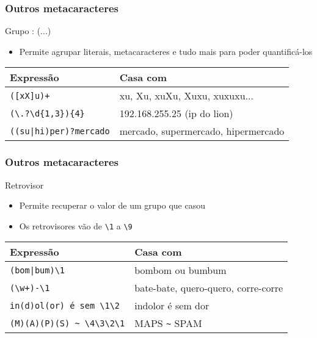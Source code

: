 \documentclass{beamer}
\begin{document}
\begin{frame}[fragile]
 \frametitle{Outros metacaracteres}
 \begin{block}{Grupo : (...)}
  \begin{itemize}
   \item Permite agrupar literais, metacaracteres e tudo mais para poder quantificá-los
  \end{itemize}

  \pause
  \begin{center}
   \begin{tabular}{|l|l|}
	\hline
	\textbf{Expressão} & \textbf{Casa com} \\
	\hline
	\verb=([xX]u)+=   & xu, Xu, xuXu, Xuxu, xuxuxu... \\
	\hline
	\verb=(\.?\d{1,3}){4}= & 192.168.255.25 {\tiny(ip do lion)} \\
	\hline
	\verb=((su|hi)per)?mercado= & {\small mercado, supermercado, hipermercado}\\
	\hline
   \end{tabular}
  \end{center}
 \end{block}
\end{frame}

\begin{frame}[fragile]
 \frametitle{Outros metacaracteres}
 \begin{block}{Retrovisor}
  \begin{itemize}
   \item Permite recuperar o valor de um grupo que casou
   \item Os retrovisores vão de \verb=\1= a \verb=\9=
  \end{itemize}

  \pause
  \begin{center}
   \begin{tabular}{|l|l|}
	\hline
	\textbf{Expressão} & \textbf{Casa com} \\
	\hline
	\verb=(bom|bum)\1= & bombom ou bumbum \\
	\hline
	\verb=(\w+)-\1= & {\small bate-bate, quero-quero, corre-corre} \\
	\hline
	\verb=in(d)ol(or) é sem \1\2= & indolor é sem dor \\
	\hline
	\verb=(M)(A)(P)(S) ~ \4\3\2\1= & MAPS \verb=~= SPAM \\
	\hline
   \end{tabular}
  \end{center}
 \end{block}
\end{frame}
\end{document}
